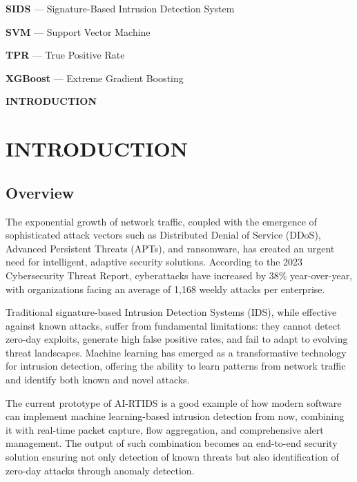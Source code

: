 \documentclass[12pt,a4paper]{report}
\newcommand{\chapterdivider}[1]{%
    \clearpage
    \thispagestyle{empty}
    \vspace*{\fill}
    \begin{center}
        \Huge\bfseries\color{mydarkblue} #1
    \end{center}
    \vspace*{\fill}
    \clearpage
}
\begin{document}
\noindent
\textbf{SIDS} --- Signature-Based Intrusion Detection System

\noindent
\textbf{SVM} --- Support Vector Machine

\noindent
\textbf{TPR} --- True Positive Rate

\noindent
\textbf{XGBoost} --- Extreme Gradient Boosting

\newpage
{}
\setcounter{page}{1}

\chapterdivider{INTRODUCTION}

\chapter{INTRODUCTION}

\section{Overview}

The exponential growth of network traffic, coupled with the emergence of sophisticated attack vectors such as Distributed Denial of Service (DDoS), Advanced Persistent Threats (APTs), and ransomware, has created an urgent need for intelligent, adaptive security solutions. According to the 2023 Cybersecurity Threat Report, cyberattacks have increased by 38\% year-over-year, with organizations facing an average of 1,168 weekly attacks per enterprise.

Traditional signature-based Intrusion Detection Systems (IDS), while effective against known attacks, suffer from fundamental limitations: they cannot detect zero-day exploits, generate high false positive rates, and fail to adapt to evolving threat landscapes. Machine learning has emerged as a transformative technology for intrusion detection, offering the ability to learn patterns from network traffic and identify both known and novel attacks.

The current prototype of AI-RTIDS is a good example of how modern software can implement machine learning-based intrusion detection from now, combining it with real-time packet capture, flow aggregation, and comprehensive alert management. The output of such combination becomes an end-to-end security solution ensuring not only detection of known threats but also identification of zero-day attacks through anomaly detection.
\end{document}
